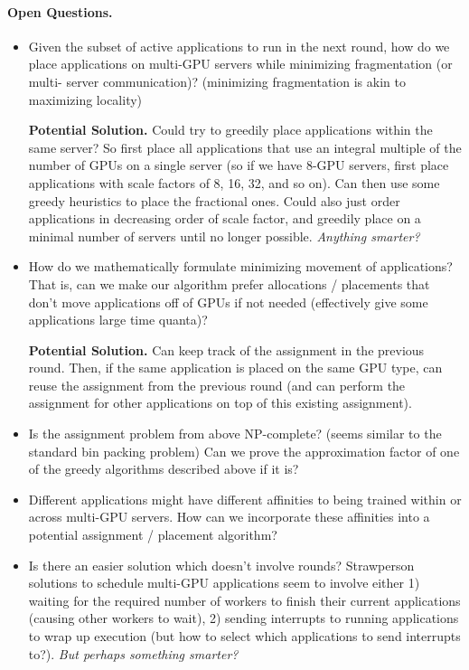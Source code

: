 \documentclass{article}
\begin{document}
\paragraph{Open Questions.}

\begin{itemize}
\item Given the subset of active applications to run in the next round, how do we
place applications on multi-GPU servers while minimizing fragmentation (or multi-
server communication)? (minimizing fragmentation is akin to maximizing locality)

\textbf{Potential Solution.} Could try to greedily place applications within the
same server? So first place all applications that use an integral multiple of
the number of GPUs on a single server (so if we have 8-GPU servers, first place
applications with scale factors of 8, 16, 32, and so on). Can then use some
greedy heuristics to place the fractional ones. Could also just order applications
in decreasing order of scale factor, and greedily place on a minimal number of
servers until no longer possible. \textit{Anything smarter?}

\item How do we mathematically formulate minimizing movement of applications?
That is, can we make our algorithm prefer allocations / placements that don't
move applications off of GPUs if not needed (effectively give some applications
large time quanta)?

\textbf{Potential Solution.} Can keep track of the assignment in the previous round. Then, if
the same application is placed on the same GPU type, can reuse the assignment from
the previous round (and can perform the assignment for other applications on top
of this existing assignment).

\item Is the assignment problem from above NP-complete? (seems similar to the
standard bin packing problem) Can we prove the approximation factor of one of
the greedy algorithms described above if it is?

\item Different applications might have different affinities to being trained
within or across multi-GPU servers. How can we incorporate these affinities into
a potential assignment / placement algorithm?

\item Is there an easier solution which doesn't involve rounds? Strawperson
solutions to schedule multi-GPU applications seem to involve either 1)
waiting for the required number of workers to finish their current applications
(causing other workers to wait), 2) sending interrupts to running applications
to wrap up execution (but how to select which applications to send interrupts to?).
\textit{But perhaps something smarter?}

\end{itemize}
\end{document}
